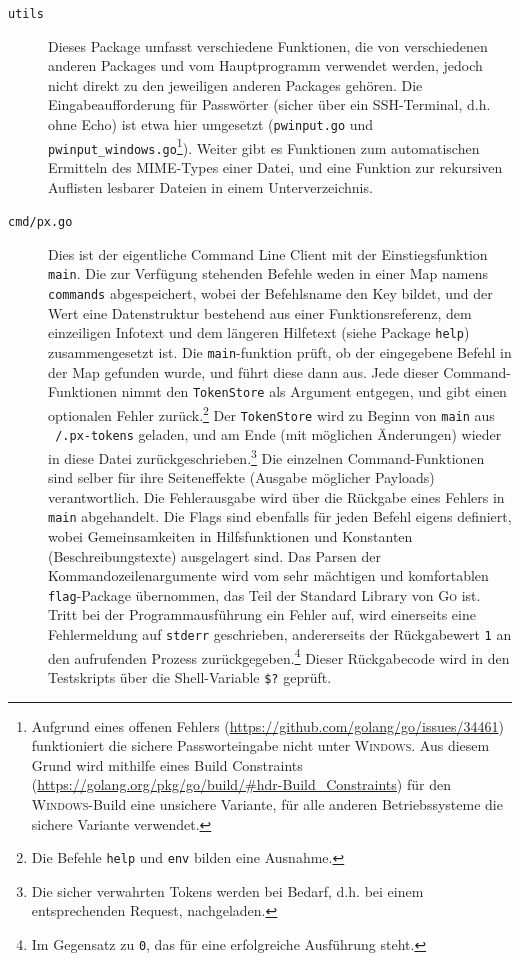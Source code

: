\begin{description}
    \item[\texttt{utils}] Dieses Package umfasst verschiedene Funktionen, die von verschiedenen anderen Packages und vom Hauptprogramm verwendet werden, jedoch nicht direkt zu den jeweiligen anderen Packages gehören. Die Eingabeaufforderung für Passwörter (sicher über ein SSH-Terminal, d.h. ohne Echo) ist etwa hier umgesetzt (\texttt{pwinput.go} und \texttt{pwinput\_windows.go}\footnote{Aufgrund eines offenen Fehlers (\url{https://github.com/golang/go/issues/34461}) funktioniert die sichere Passworteingabe nicht unter \textsc{Windows}. Aus diesem Grund wird mithilfe eines Build Constraints (\url{https://golang.org/pkg/go/build/\#hdr-Build\_Constraints}) für den \textsc{Windows}-Build eine unsichere Variante, für alle anderen Betriebssysteme die sichere Variante verwendet.}). Weiter gibt es Funktionen zum automatischen Ermitteln des MIME-Types einer Datei, und eine Funktion zur rekursiven Auflisten lesbarer Dateien in einem Unterverzeichnis.
    \item[\texttt{cmd/px.go}] Dies ist der eigentliche Command Line Client mit der Einstiegsfunktion \texttt{main}. Die zur Verfügung stehenden Befehle weden in einer Map namens \texttt{commands} abgespeichert, wobei der Befehlsname den Key bildet, und der Wert eine Datenstruktur bestehend aus einer Funktionsreferenz, dem einzeiligen Infotext und dem längeren Hilfetext (siehe Package \texttt{help}) zusammengesetzt ist. Die \texttt{main}-funktion prüft, ob der eingegebene Befehl in der Map gefunden wurde, und führt diese dann aus. Jede dieser Command-Funktionen nimmt den \texttt{TokenStore} als Argument entgegen, und gibt einen optionalen Fehler zurück.\footnote{Die Befehle \texttt{help} und \texttt{env} bilden eine Ausnahme.} Der \texttt{TokenStore} wird zu Beginn von \texttt{main} aus \texttt{~/.px-tokens} geladen, und am Ende (mit möglichen Änderungen) wieder in diese Datei zurückgeschrieben.\footnote{Die sicher verwahrten Tokens werden bei Bedarf, d.h. bei einem entsprechenden Request, nachgeladen.} Die einzelnen Command-Funktionen sind selber für ihre Seiteneffekte (Ausgabe möglicher Payloads) verantwortlich. Die Fehlerausgabe wird über die Rückgabe eines Fehlers in \texttt{main} abgehandelt. Die Flags sind ebenfalls für jeden Befehl eigens definiert, wobei Gemeinsamkeiten in Hilfsfunktionen und Konstanten (Beschreibungstexte) ausgelagert sind. Das Parsen der Kommandozeilenargumente wird vom sehr mächtigen und komfortablen \texttt{flag}-Package übernommen, das Teil der Standard Library von \textsc{Go} ist. Tritt bei der Programmausführung ein Fehler auf, wird einerseits eine Fehlermeldung auf \texttt{stderr} geschrieben, andererseits der Rückgabewert \texttt{1} an den aufrufenden Prozess zurückgegeben.\footnote{Im Gegensatz zu \texttt{0}, das für eine erfolgreiche Ausführung steht.} Dieser Rückgabecode wird in den Testskripts über die Shell-Variable \texttt{\$?} geprüft.
\end{description}

